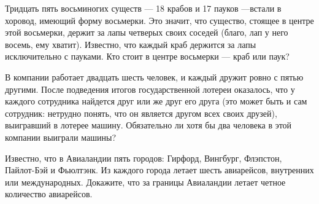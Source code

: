 ﻿
\begin{enumerate}
\itA Тридцать пять восьминогих существ — 18 крабов и 17 пауков —\linebreak встали в хоровод, имеющий форму восьмерки. Это значит, что существо, стоящее в центре этой восьмерки, держит за лапы четверых своих соседей (благо, лап у него восемь, ему хватит). Известно, что каждый краб держится за лапы исключительно с пауками. Кто стоит в центре восьмерки --- краб или паук?

\itB В компании работает двадцать шесть человек, и каждый дружит ровно с пятью другими. После подведения итогов государственной лотереи оказалось, что у каждого сотрудника найдется друг или же друг его друга (это может быть и сам сотрудник: нетрудно понять, что он является другом всех своих друзей), выигравший в лотерее машину. Обязательно ли хотя бы два человека в этой компании выиграли машины?

\itC Известно, что в Авиаландии пять городов: Гирфорд, Вингбург, Флэпстон, Пайлот-Бэй и Фьюлтэнк. Из каждого города летает шесть авиарейсов, внутренних или международных. Докажите, что за границы Авиаландии летает четное количество авиарейсов.
\end{enumerate}